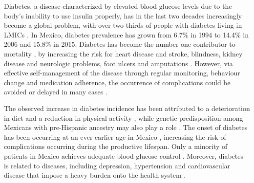 \documentclass[12pt,english]{article}
\begin{document}
Diabetes, a disease characterized by elevated blood glucose levels due to the body's inability to use insulin properly, has in the last two decades increasingly become a global problem, with over two-thirds of people with diabetes living in \acp{LMIC} \parencite{InternationalDiabetesFederation2015}. In Mexico, diabetes prevalence has grown from 6.7\% in 1994 to 14.4\% in 2006 \parencite{Barquera2013} and 15.8\% in 2015. Diabetes has become the number one contributor to mortality \parencite{InternationalDiabetesFederation2015}, by increasing the risk for heart disease and stroke, blindness, kidney disease and neurologic problems, foot ulcers and amputations \parencite{Reynoso-Noveron2011}. However, via effective self-management of the disease through regular monitoring, behaviour change and medication adherence, the occurrence of complications could be avoided or delayed in many cases \parencite{Lim2011, Gregg2012}.

The observed increase in diabetes incidence has been attributed to a deterioration in diet and a reduction in physical activity \parencite{Barquera2008b,Basu2013}, while genetic predisposition among Mexicans with pre-Hispanic ancestry may also play a role \parencite{Williams2013}. The onset of diabetes has been occurring at an ever earlier age in Mexico \parencite{Bello-Chavolla2017a}, increasing the risk of complications occurring during the productive lifespan. Only a minority of patients in Mexico achieves adequate blood glucose control \parencite{Barquera2013}. Moreover, diabetes is related to diseases, including depression, hypertension and cardiovascular disease that impose a heavy burden onto the health system \parencite{WorldHealthOrganization2016}.
\end{document}

